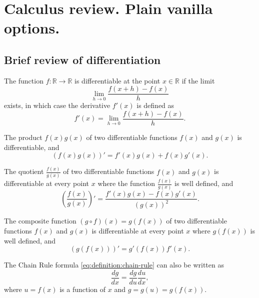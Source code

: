 \chapter{Calculus review. Plain vanilla options.}

\section{Brief review of differentiation}
The function $ f : \mathbb{R} \rightarrow \mathbb{R} $ is differentiable at the
    point $ x \in \mathbb{R} $ if the limit
\begin{equation*}
    \lim_{h \rightarrow 0} \frac{f(x + h) - f(x)}{h}
\end{equation*}
exists, in which case the derivative $ f'(x) $ is defined as
\begin{equation}
    f'(x) = \lim_{h \rightarrow 0} \frac{f(x + h) - f(x)}{h}.
    \label{eq:definition:derivative}
\end{equation}
\begin{theorem}
    The product $ f(x) g(x) $ of two differentiable functions $ f(x) $ and
        $ g(x) $ is differentiable, and
    \begin{equation}
        (f(x) g(x))' = f'(x) g(x) + f(x) g'(x).
        \label{eq:theorem:product-rule}
    \end{equation}
\end{theorem}
\begin{theorem}
    The quotient $ \frac{f(x)}{g(x)} $ of two differentiable functions $ f(x) $
        and $ g(x) $ is differentiable at every point $ x $ where the function
        $ \frac{f(x)}{g(x)} $ is well defined, and
    \begin{equation}
        \left( \frac{f(x)}{g(x)} \right)' =
            \frac{f'(x) g(x) - f(x) g'(x)}{(g(x))^2}.
        \label{eq:definition:quotient-rule}
    \end{equation}
\end{theorem}
\begin{theorem}
    The composite function $ (g \circ f)(x) = g(f(x)) $ of two differentiable
        functions $ f(x) $ and $ g(x) $ is differentiable at every point $ x $
        where $ g(f(x)) $ is well defined, and
    \begin{equation}
        (g(f(x)))' = g'(f(x)) f'(x).
        \label{eq:definition:chain-rule}
    \end{equation}
\end{theorem}
The Chain Rule formula \eqref{eq:definition:chain-rule} can also be written as
\begin{equation*}
    \frac{dg}{dx} = \frac{dg}{du} \frac{du}{dx},
\end{equation*}
where $ u = f(x) $ is a function of $ x $ and $ g = g(u) = g(f(x)) $.

